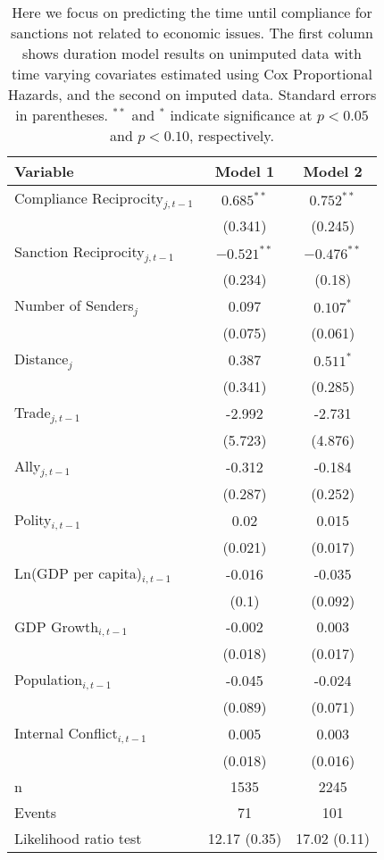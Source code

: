 \begin{table}[ht]
\centering
{\normalsize
\begin{tabular}{lcc}
 Variable & Model 1 & Model 2 \\ 
  \hline
\hline
Compliance Reciprocity$_{j,t-1}$ & $0.685^{\ast\ast}$ & $0.752^{\ast\ast}$ \\ 
   & (0.341) & (0.245) \\ 
  Sanction Reciprocity$_{j,t-1}$ & $-0.521^{\ast\ast}$ & $-0.476^{\ast\ast}$ \\ 
   & (0.234) & (0.18) \\ 
   \hline
Number of Senders$_{j}$ & 0.097 & $0.107^{\ast}$ \\ 
   & (0.075) & (0.061) \\ 
  Distance$_{j}$ & 0.387 & $0.511^{\ast}$ \\ 
   & (0.341) & (0.285) \\ 
  Trade$_{j,t-1}$ & -2.992 & -2.731 \\ 
   & (5.723) & (4.876) \\ 
  Ally$_{j,t-1}$ & -0.312 & -0.184 \\ 
   & (0.287) & (0.252) \\ 
   \hline
Polity$_{i,t-1}$ & 0.02 & 0.015 \\ 
   & (0.021) & (0.017) \\ 
  Ln(GDP per capita)$_{i,t-1}$ & -0.016 & -0.035 \\ 
   & (0.1) & (0.092) \\ 
  GDP Growth$_{i,t-1}$ & -0.002 & 0.003 \\ 
   & (0.018) & (0.017) \\ 
  Population$_{i,t-1}$ & -0.045 & -0.024 \\ 
   & (0.089) & (0.071) \\ 
  Internal Conflict$_{i,t-1}$ & 0.005 & 0.003 \\ 
   & (0.018) & (0.016) \\ 
   \hline
n & 1535 & 2245 \\ 
  Events & 71 & 101 \\ 
  Likelihood ratio test & 12.17 (0.35) & 17.02 (0.11) \\ 
   \hline
\hline
\end{tabular}
}
\caption{Here we focus on predicting the time until compliance for sanctions not related to economic issues. The first column shows duration model results on unimputed data with time varying covariates estimated using Cox Proportional Hazards, and the second on imputed data. Standard errors in parentheses. $^{**}$ and $^{*}$ indicate significance at $p< 0.05 $ and $p< 0.10 $, respectively.} 
\label{tab:regResultsNonEconSanctions}
\end{table}

